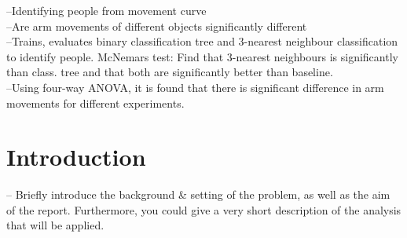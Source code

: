 \documentclass[12pt,fleqn]{article}
\title{}
\author{Asger Schultz}
\date{\today}
\begin{document}
\maketitle
--Identifying people from movement curve\\
--Are arm movements of different objects significantly different\\
--Trains, evaluates binary classification tree and 3-nearest neighbour classification to identify people. McNemars test: Find that 3-nearest neighbours is significantly than class. tree and that both are significantly better than baseline.\\
--Using four-way ANOVA, it is found that there is significant difference in arm movements for different experiments.
\tableofcontents
\newpage 


\section{Introduction}

-- Briefly introduce the background \& setting of the problem, as well as the aim of the report. Furthermore, you could give a very short description of the analysis that will be applied.
\end{document}
